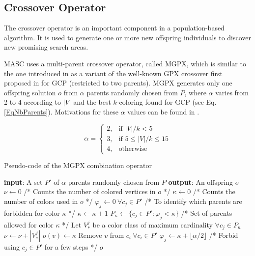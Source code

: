 \documentclass{elsart}
\begin{document}
\subsection{Crossover Operator}
\label{subsec_sol_crossover_operator}

The crossover operator is an important component in a population-based algorithm. It is used to generate one or more new offspring individuals to discover new promising search areas.

MASC uses a multi-parent crossover operator, called MGPX, which is similar to the one introduced in \cite{Hamiez&Hao2002} as a variant of the well-known GPX crossover first proposed in \cite{Galinier&Hao1999} for GCP (restricted to two parents). MGPX generates only one offspring solution $o$ from $\alpha$ parents randomly chosen from $P$, where $\alpha$ varies from 2 to 4 according to $|V|$ and the best $k$-coloring found for GCP (see Eq. \ref{EqNbParents}). Motivations for these $\alpha$ values can be found in \cite{Porumbel&al2010}.

\begin{equation}
\alpha= \left \{ \begin{array} {ll}
2,   &   \textrm{if $|V| / k < 5$} \\
3,   &    \textrm{if $5 \le |V| / k \le 15$}\\
4,   &    \textrm{otherwise}
\end{array}  \right.
\label{EqNbParents}
\end{equation}


\begin{algorithm}[h]
\footnotesize
\caption{Pseudo-code of the MGPX combination operator}
\label{AlgoMGPX}
\begin{algorithmic}[1]
\STATE \textbf{input}: A set $P'$ of $\alpha$ parents randomly chosen from $P$
\STATE \textbf{output}: An offspring $o$
\STATE $\nu \gets 0$ /* Counts the number of colored vertices in $o$ */
\STATE $\kappa \gets 0$ /* Counts the number of colors used in $o$ */
\STATE $\varphi_j \gets 0~\forall c_j \in P'$ /* To identify which parents are forbidden for color $\kappa$ */
	\STATE $\kappa \gets \kappa + 1$
	\STATE $P_\kappa \gets \{c_j \in P': \varphi_j < \kappa\}$ /* Set of parents allowed for color $\kappa$ */
	\STATE Let $V_*^j$ be a color class of maximum cardinality $\forall c_j \in P_\kappa$
	\STATE $\nu \gets \nu + |V_*^j|$
		\STATE $o(v) \gets \kappa$
		\STATE Remove $v$ from $c_i~\forall c_i \in P'$
	\ENDFOR
	\STATE $\varphi_j \gets \kappa + \lfloor \alpha / 2 \rfloor$ /* Forbid using $c_j \in P'$ for a few steps */
\ENDWHILE
\RETURN $o$
\end{algorithmic}
\end{algorithm}
\end{document}
